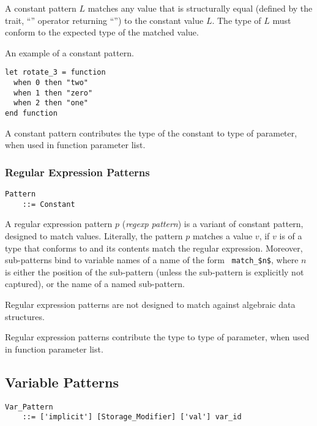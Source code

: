 A constant pattern $L$ matches any value that is structurally equal (defined by the  trait, ``\code{=}'' operator returning ``'') to the constant value $L$. The type of $L$ must conform to the expected type of the matched value. 

\example An example of a constant pattern. 
\begin{lstlisting}
let rotate_3 = function
  when 0 then "two"
  when 1 then "zero"
  when 2 then "one"
end function
\end{lstlisting}

A constant pattern contributes the type of the constant to type of parameter, when used in function parameter list. 





\subsubsection{Regular Expression Patterns}
\label{sec:regexp-patterns}

\grammar\begin{lstlisting}
Pattern 
    ::= Constant
\end{lstlisting}

A regular expression pattern $p$ ({\em regexp pattern}) is a variant of constant pattern, designed to match  values. Literally, the pattern $p$ matches a value $v$, if $v$ is of a type that conforms to  and its contents match the regular expression. Moreover, sub-patterns bind to variable names of a name of the form ~\lstinline!match_$n$!, where $n$ is either the position of the sub-pattern (unless the sub-pattern is explicitly not captured), or the name of a named sub-pattern. 

Regular expression patterns are not designed to match against algebraic data structures. 

Regular expression patterns contribute the  type to type of parameter, when used in function parameter list. 






\subsection{Variable Patterns}
\label{sec:variable-patterns}

\grammar\begin{lstlisting}
Var_Pattern 
    ::= ['implicit'] [Storage_Modifier] ['val'] var_id
\end{lstlisting}

